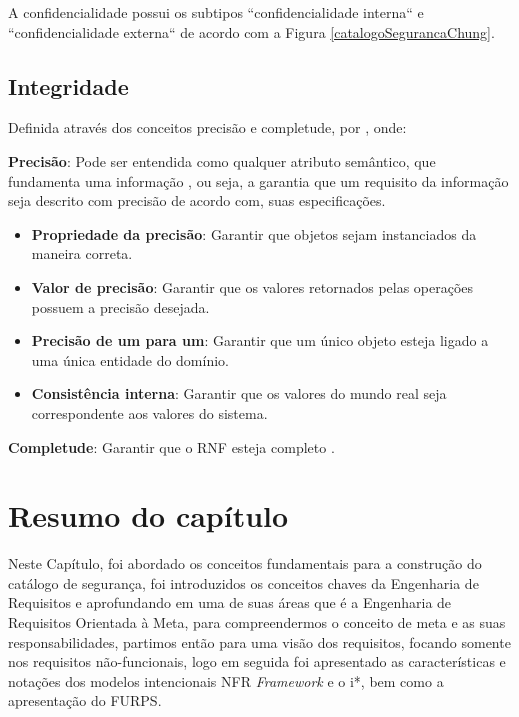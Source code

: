 A confidencialidade possui os subtipos ``confidencialidade interna`` e ``confidencialidade externa`` de acordo com a Figura \ref{catalogoSegurancaChung}.
 

\subsection{Integridade}
\label{subsec:integridade}
 
Definida através dos conceitos precisão e completude, por \cite{chung2012non}, onde: 

\textbf{Precisão}: Pode ser entendida como qualquer atributo semântico, que fundamenta uma informação \cite{chung2012non}, ou seja, a garantia que um requisito da informação seja descrito com precisão de acordo com, suas especificações. 

\begin{itemize}
	\item \textbf{Propriedade da precisão}: Garantir que objetos sejam instanciados da maneira correta. 
	
	\item \textbf{Valor de precisão}: Garantir que os valores retornados pelas operações possuem a precisão desejada.
	
	\item \textbf{Precisão de um para um}: Garantir que um único objeto esteja ligado a uma única entidade do domínio. 
	
	\item \textbf{Consistência interna}: Garantir que os valores do mundo real seja correspondente aos valores do sistema.
\end{itemize}

\textbf{Completude}: Garantir que o RNF esteja completo \cite{chung2012non}. 

\section{Resumo do capítulo}

Neste Capítulo, foi abordado os conceitos fundamentais para a construção do catálogo de segurança, foi introduzidos os conceitos chaves da Engenharia de Requisitos e aprofundando em uma de suas áreas que é a Engenharia de Requisitos Orientada à Meta, para compreendermos o conceito de meta e as suas responsabilidades, partimos então para uma visão dos requisitos, focando somente nos requisitos não-funcionais, logo em seguida foi apresentado as características e notações dos modelos intencionais NFR \textit{Framework} e o i*, bem como a apresentação do FURPS. 


